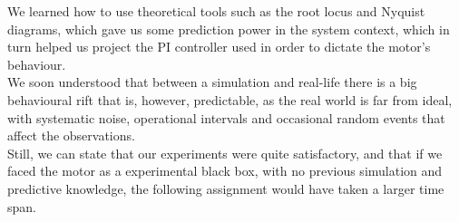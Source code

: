 \documentclass[a4paper,8pt]{extarticle}
\begin{document}
        We learned how to use theoretical tools such as the root locus and Nyquist diagrams, which gave us some prediction power in the system context, which in turn helped us project the PI controller used in order to dictate the motor's behaviour.\\
        
        We soon understood that between a simulation and real-life there is a big behavioural rift that is, however, predictable, as the real world is far from ideal, with systematic noise, operational intervals and occasional random events that affect the observations.\\
        
        Still, we can state that our experiments were quite satisfactory, and that if we faced the motor as a experimental black box, with no previous simulation and predictive knowledge, the following assignment would have taken a larger time span.
\end{document}
